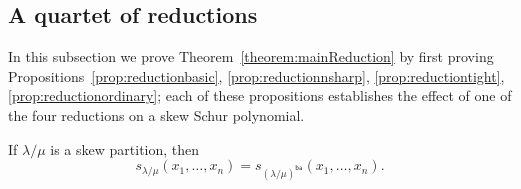 \documentclass[ALCO,ThmDefs,Unicode,epreuves]{cedram}
\newcommand{\ba}{\mathsf{ba}}
\begin{document}
\subsection{A quartet of reductions}\label{subsec:treductions} In this subsection we prove Theorem~\ref{theorem:mainReduction} by first proving Propositions~\ref{prop:reductionbasic}, \ref{prop:reductionnsharp}, \ref{prop:reductiontight}, \ref{prop:reductionordinary}; each of these propositions establishes the effect of one of the four reductions on a skew Schur polynomial. 

\begin{prop}[{\cite[Lemma 2]{TY10}}]
\label{prop:reductionbasic}
If $\lambda / \mu$ is a skew partition, then 
\[s_{\lambda / \mu}(x_1,\ldots,x_n) = s_{(\lambda / \mu)^\ba }(x_1,\ldots,x_n).
\]
\end{prop}
\end{document}
